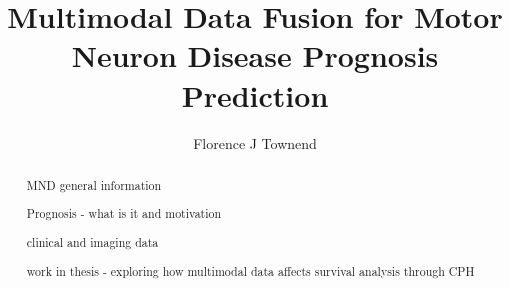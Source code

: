 
\title{Multimodal Data Fusion for Motor Neuron Disease Prognosis Prediction}
\author{Florence J Townend}

\maketitle
\makedeclaration

\begin{abstract} %

MND general information

Prognosis - what is it and motivation

clinical and imaging data

work in thesis 
- exploring how multimodal data affects survival analysis through CPH

\end{abstract}




\setcounter{tocdepth}{2} 

\tableofcontents
\listoffigures
\listoftables

